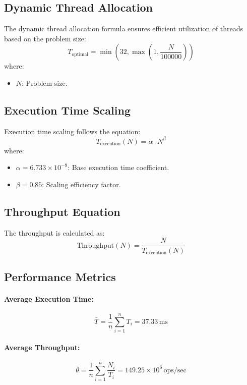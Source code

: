 \documentclass{article}
\theoremstyle{plain}
\begin{document}
\subsection{Dynamic Thread Allocation}
The dynamic thread allocation formula ensures efficient utilization of threads based on the problem size:
\begin{equation}
T_{\text{optimal}} = \min(32, \max(1, \frac{N}{100000}))
\end{equation}
where:
\begin{itemize}
    \item $N$: Problem size.
\end{itemize}

\subsection{Execution Time Scaling}
Execution time scaling follows the equation:
\begin{equation}
T_{\text{execution}}(N) = \alpha \cdot N^{\beta}
\end{equation}
where:
\begin{itemize}
    \item $\alpha = 6.733 \times 10^{-9}$: Base execution time coefficient.
    \item $\beta = 0.85$: Scaling efficiency factor.
\end{itemize}

\subsection{Throughput Equation}
The throughput is calculated as:
\begin{equation}
\text{Throughput}(N) = \frac{N}{T_{\text{execution}}(N)}
\end{equation}

\subsection{Performance Metrics}
\paragraph{Average Execution Time:}
\begin{equation}
\bar{T} = \frac{1}{n} \sum_{i=1}^{n} T_i = 37.33 \, \text{ms}
\end{equation}

\paragraph{Average Throughput:}
\begin{equation}
\bar{\theta} = \frac{1}{n} \sum_{i=1}^{n} \frac{N_i}{T_i} = 149.25 \times 10^6 \, \text{ops/sec}
\end{equation}
\end{document}

